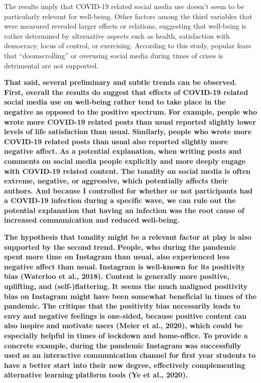\documentclass[
  man,mask]{apa7}
\begin{document}
The results imply that COVID-19 related social media use doesn't seem to be particularly relevant for well-being.
Other factors among the third variables that were measured revealed larger effects or relations, suggesting that well-being is rather determined by alternative aspects such as health, satisfaction with democracy, locus of control, or exercising.
According to this study, popular fears that ``doomscrolling'' or overusing social media during times of crises is detrimental are not supported.

\textbf{That said, several preliminary and subtle trends can be observed.}
\textbf{First, overall the results do suggest that effects of COVID-19 related social media use on well-being rather tend to take place in the negative as opposed to the positive spectrum.}
\textbf{For example, people who wrote more COVID-19 related posts than usual reported slightly lower levels of life satisfaction than usual.}
\textbf{Similarly, people who wrote more COVID-19 related posts than usual also reported slightly more negative affect.}
\textbf{As a potential explanation, when writing posts and comments on social media people explicitly and more deeply engage with COVID-19 related content.}
\textbf{The tonality on social media is often extreme, negative, or aggressive, which potentially affects their authors.}
\textbf{And because I controlled for whether or not participants had a COVID-19 infection during a specific wave, we can rule out the potential explanation that having an infection was the root cause of increased communication and reduced well-being.}

\textbf{The hypothesis that tonality might be a relevant factor at play is also supported by the second trend.}
\textbf{People, who during the pandemic spent more time on Instagram than usual, also experienced less negative affect than usual.}
\textbf{Instagram is well-known for its positivity bias (Waterloo et al., 2018).}
\textbf{Content is generally more positive, uplifting, and (self-)flattering.}
\textbf{It seems the much maligned positivity bias on Instagram might have been somewhat beneficial in times of the pandemic.}
\textbf{The critique that the positivity bias necessarily leads to envy and negative feelings is one-sided, because positive content can also inspire and motivate users (Meier et al., 2020), which could be especially helpful in times of lockdown and home-office.}
\textbf{To provide a concrete example, during the pandemic Instagram was successfully used as an interactive communication channel for first year students to have a better start into their new degree, effectively complementing alternative learning platform tools (Ye et al., 2020).}
\end{document}
